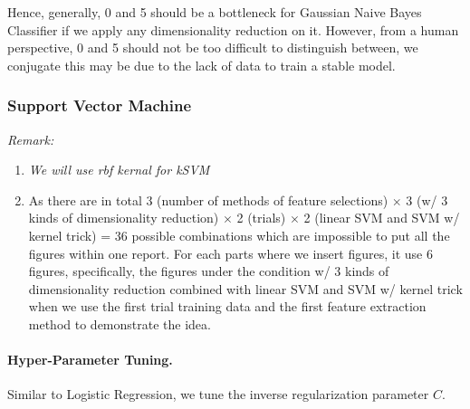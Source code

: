\documentclass{article}
\begin{document}
Hence, generally, 0 and 5 should be a bottleneck for Gaussian Naive Bayes Classifier if we apply any dimensionality reduction on it. However, from a human perspective, 0 and 5 should not be too difficult to distinguish between, we conjugate this may be due to the lack of data to train a stable model.

\subsubsection{Support Vector Machine}
\emph{Remark:}

\begin{enumerate}
    \item \emph{We will use rbf kernal for kSVM}
    \item As there are in total 3 (number of methods of feature selections) $\times$ 3 (w/ 3 kinds of dimensionality reduction) $\times$ 2 (trials) $\times$ 2 (linear SVM and SVM w/ kernel trick) = 36 possible combinations which are impossible to put all the figures within one report. For each parts where we insert figures, it use 6 figures, specifically, the figures under the condition w/ 3 kinds of dimensionality reduction combined with linear SVM and SVM w/ kernel trick when we use the first trial training data and the first feature extraction method to demonstrate the idea.
\end{enumerate}

\paragraph{Hyper-Parameter Tuning.}
Similar to Logistic Regression, we tune the inverse regularization parameter $C$.
\end{document}

